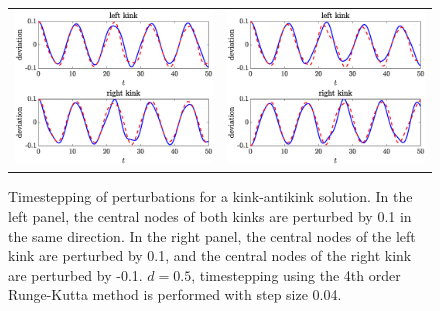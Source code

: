 \documentclass[12pt,reqno]{amsart}
\begin{document}


\begin{figure}[H]
	\begin{center}
	\begin{tabular}{cc}
	\includegraphics[width=6cm]{kakoscG1.eps} &
	\includegraphics[width=6cm]{kakoscG2.eps} 
	\end{tabular}
	\end{center}
	\caption{Timestepping of perturbations for a kink-antikink solution. In the left panel, the central nodes of both kinks are perturbed by 0.1 in the same direction. In the right panel, the central nodes of the left kink are perturbed by 0.1, and the central nodes of the right kink are perturbed by -0.1. $d = 0.5$, timestepping using the 4th order Runge-Kutta method
	is performed with step size 0.04.} 
	\label{fig:kaktimestep}
\end{figure}
\end{document}
